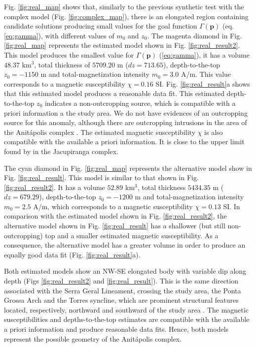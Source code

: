 Fig. \ref{fig:real_map} shows that, similarly to the previous synthetic test with the 
complex model (Fig. \ref{fig:complex_map}), there is an elongated region containing 
candidate solutions producing small values for the goal function 
$\Gamma(\mathbf{p})$ (eq. \ref{eq:gamma}), with different values of $m_0$ and $z_0$.
The magenta diamond in Fig. \ref{fig:real_map} represents the estimated model 
shown in Fig. \ref{fig:real_result2}. 
This model produces the smallest value for $ \Gamma(\mathbf{p}) $ (\ref{eq:gamma}),
it has a volume $ 48.37 $ km$ ^3 $, total thickness of $ 5709.20 $ m 
($ dz = 713.65 $), depth-to-the-top $z_0 = -1150$ m and total-magnetization intensity 
$m_0 = 3.0$ A/m. This value corresponds to a magnetic susceptibility 
$\chi = 0.16$ SI.
Fig. \ref{fig:real_result}a shows that this estimated model produces a reasonable data fit.
This estimated depth-to-the-top $z_0$ indicates a non-outcropping source, 
which is compatible with a priori information a the study area. 
We do not have evidences of an outcropping source for this anomaly, 
although there are outcropping intrusions in the area of the Anit{\'a}polis 
complex \cite[]{gibson-1999}.
The estimated magnetic susceptibility $ \chi $ is also compatible with the 
available a priori information. It is close to the upper limit found by 
\citet{valdivia-2009} in the Jacupiranga complex.

The cyan diamond in Fig. \ref{fig:real_map} represents the alternative model 
show in Fig. \ref{fig:real_result}. This model is similar to that shown in 
Fig. \ref{fig:real_result2}. It has a volume $ 52.89 $ km$ ^3 $, total thickness 
$ 5434.35 $ m ($ dz = 679.29 $), depth-to-the-top $z_0 = -1200$ m and 
total-magnetization intensity $m_0 = 2.5$ A/m, which corresponds to a magnetic 
susceptibility $\chi = 0.13$ SI. 
In comparison with the estimated model shown in Fig. \ref{fig:real_result2}, the alternative model 
shown in Fig. \ref{fig:real_result} has a shallower (but still non-outcropping) top
and a smaller estimated magnetic susceptibility. As a consequence, the alternative 
model has a greater volume in order to produce an equally good data fit 
(Fig. \ref{fig:real_result}a).

Both estimated models show an NW-SE elongated body with variable dip along depth 
(Figs \ref{fig:real_result2} and \ref{fig:real_result}).
This is the same direction associated with the Serra Geral Lineament, 
crossing the study area, the Ponta Grossa Arch and the Torres syncline,
which are prominent structural features located, respectively, 
northward and southward of the study area \citep[e.g., ][ p. 535]{scheibe-etal2005}.
The magnetic susceptibilities and depths-to-the-top estimates are compatible with 
the available a priori information and produce reasonable data fits.
Hence, both models represent the possible geometry of the Anit{\'a}polis complex. 